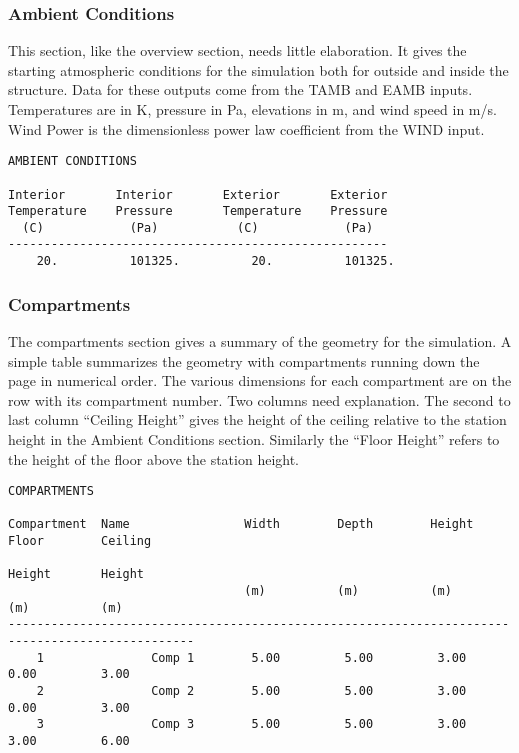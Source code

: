 \subsubsection{Ambient Conditions}

This section, like the overview section, needs little elaboration.  It gives the starting atmospheric conditions for the simulation both for outside and inside the structure. Data for these outputs come from the TAMB and EAMB inputs. Temperatures are in K, pressure in Pa, elevations in m, and wind speed in m/s. Wind Power is the dimensionless power law coefficient from the WIND input.
\begin{lstlisting}[basicstyle=\tiny]
AMBIENT CONDITIONS

Interior       Interior       Exterior       Exterior
Temperature    Pressure       Temperature    Pressure
  (C)            (Pa)           (C)            (Pa)
-----------------------------------------------------
    20.          101325.          20.          101325.
\end{lstlisting}

\subsubsection{Compartments}

The compartments section gives a summary of the geometry for the simulation.  A simple table summarizes the geometry with compartments running down the page in numerical order.  The various dimensions for each compartment are on the row with its compartment number.  Two columns need explanation.  The second to last column ``Ceiling Height'' gives the height of the ceiling relative to the station height in the Ambient Conditions section.  Similarly the ``Floor Height'' refers to the height of the floor above the station height.

\begin{lstlisting}[basicstyle=\tiny]
COMPARTMENTS

Compartment  Name                Width        Depth        Height       Floor        Ceiling
                                                                        Height       Height
                                 (m)          (m)          (m)          (m)          (m)
------------------------------------------------------------------------------------------------
    1               Comp 1        5.00         5.00         3.00         0.00         3.00
    2               Comp 2        5.00         5.00         3.00         0.00         3.00
    3               Comp 3        5.00         5.00         3.00         3.00         6.00
\end{lstlisting}


